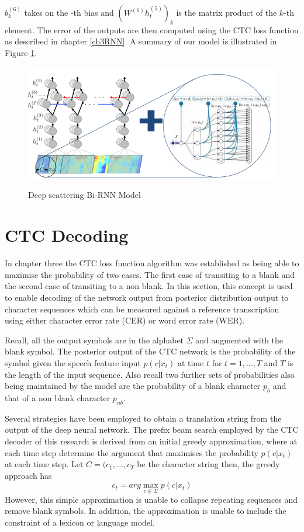 $b^{(6)}_k$ takes on the -th bias and $(W^{(6)} h^{(5)}_t)_k$ is the matrix product of the $k$-th element.  The error of the outputs are then computed using the CTC loss function \cite{graves_2014} as described in chapter \ref{ch3RNN}.  A summary of our model is illustrated in Figure \ref{fig_6_1_ctc_scatter}.
\begin{figure}
\centering
  \includegraphics[width=14cm]{thesis/images/ctc_scatter.png}\\
  \caption{Deep scattering Bi-RNN Model} \label{fig_6_1_ctc_scatter}
\end{figure}

\section{CTC Decoding}

In chapter three the CTC loss function algorithm was established as being able to maximise the probability of two cases.  The first case of transiting to a blank and the second case of transiting to a non blank.  In this section, this concept is used to enable decoding of the network output from posterior distribution output to character sequences which can be measured against a reference transcription using either character error rate (CER) or word error rate (WER).

Recall, all the output symbols are in the alphabet $\Sigma$ and augmented with the blank symbol. The posterior output of the CTC network is the probability of the symbol given the speech feature input $p(c|x_t)$ at time $t$ for $t=1,\dots,T$ and $T$ is the length of the input sequence.  Also recall two further sets of probabilities also being maintained by the model are the probability of a blank character $p_b$ and that of a non blank character $p_{nb}$.

Several strategies have been employed to obtain a translation string from the output of the deep neural network.  The prefix beam search employed by the CTC decoder of this research is derived from an initial greedy approximation, where at each time step determine the argument that maximises the  probability $p(c|x_t)$ at each time step. Let $C=(c_1,\dots,c_T$ be the character string then, the greedy approach has 
\begin{equation}
    c_t=arg\max_{c\in\Sigma}p(c|x_t)
\end{equation}
However, this simple approximation is unable to collapse repeating sequences and remove blank symbols. In addition, the approximation is unable to include the constraint of a lexicon or language model.

